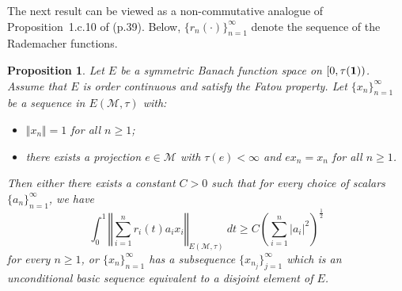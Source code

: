 \documentclass[12pt]{amsart}
\let\cal\mathcal
\newtheorem{proposition}[theorem]{Proposition}
\def\m{{\cal M}}
\numberwithin{equation}{section}
\numberwithin{theorem}{section}
\begin{document}
\smallskip

The next result can be viewed as a non-commutative analogue of
Proposition~1.c.10 of \cite{LT}(p.39). Below, $\{r_n(\cdot)\}_{n=1}^\infty$ 
denote the sequence of the Rademacher functions.

\begin{proposition}\label{dichotomy2}
Let $E$ be a symmetric Banach 
function space on $[0,\tau({\bf 1}))$. Assume that 
$E$ is order continuous and satisfy  the Fatou
property. Let $\{x_n\}_{n=1}^\infty$ be a sequence  
in $E(\cal M, \tau)$ with:
\begin{itemize}
\item[(i)] $\Vert x_n \Vert =1$ for all $n\geq 1$;
\item[(ii)] there exists a projection $e \in \cal{M}$ with
$\tau(e)<\infty$ and $ex_n=x_n$ for all $n\geq 1$.
\end{itemize}
Then either there exists a constant $C>0$ such that for every choice of
scalars $\{a_n\}_{n=1}^\infty$, we have
$$\int_{0}^1 \left\Vert \sum_{i=1}^n r_i(t)a_ix_i \right\Vert_{E(\m, \tau)}\ dt
\geq C \left(\sum_{i=1}^n \vert a_i \vert^2 \right)^{\frac{1}{2}}$$
for every $n\geq 1$, or
$\{x_n\}_{n=1}^\infty$ has a subsequence $\{x_{n_j}\}_{j=1}^\infty$ 
which is an unconditional basic
sequence equivalent to a disjoint element of $E$.
\end{proposition}
\end{document}
